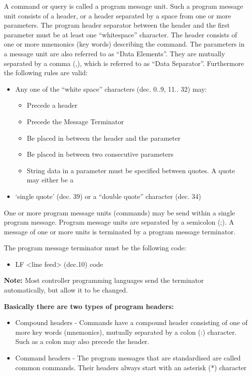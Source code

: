 A command or query is called a program message unit. Such a program message unit consists of a header, or a header separated by a space from one or more parameters. The program header separator between the header and the first parameter must be at least one ``whitespace'' character. The header consists of one or more mnemonics (key words) describing the command. The parameters in a message unit are also referred to as ``Data Elements''. They are mutually separated by a comma (,), which is referred to as ``Data Separator''. Furthermore the following rules are valid:

\begin{itemize}
\item Any one of the ``white space'' characters (dec. 0..9, 11.. 32) may:
\begin{itemize}
\item Precede a header
\item Precede the Message Terminator
\item Be placed in between the header and the parameter
\item Be placed in between two consecutive parameters
\item String data in a parameter must be specified between quotes. A quote may either be a
\end{itemize}
\item `single quote' (dec. 39) or a ``double quote'' character (dec. 34)
\end{itemize}

One or more program message units (commands) may be send within a single program message. Program message units are separated by a semicolon (;). A message of one or more units is terminated by a program message terminator.

The program message terminator must be the following code:
\begin{itemize}
\item LF <line feed> (dec.10) code
\end{itemize}

\textbf{Note:} Most controller programming languages send the terminator automatically, but allow it to be changed.

\textbf{Basically there are two types of program headers:}
\begin{itemize}
\item Compound headers - Commands have a compound header consisting of one of more key words (mnemonics), mutually separated by a colon (:) character. Such as a colon may also precede the header.
\item Command headers - The program messages that are standardised are called common commands. Their headers always start with an asterisk (*) character 
\end{itemize}

